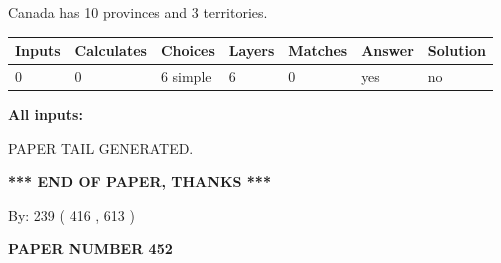 \documentclass[12pt]{article}
\begin{document}
 
\noindent{}
 
 
Canada has 10  provinces and 3 territories.
 
 
\noindent{}
 
 
   
   
   
   
\noindent\begin{tabular}{|l|l|l|l|l|l|l|}
 \hline
Inputs & Calculates & Choices & Layers & Matches & Answer & Solution \\ \hline
 0  & 
 0  & 
 6
  simple  
  & 
 6  & 
 0  & 
  yes & 
  no 
  \\ \hline
 \end{tabular}
   
   
   
   
\noindent{}
   
   
   
   
\noindent\vspace{0.1in}\hspace{-0.08in} {\textbf{\Large{All inputs: }}}
   
   
   
   
   
   
 \vspace{0.2in}
 
   
   
\vspace{2.0in} PAPER TAIL GENERATED.
   
   
   
   
\vspace{1.0in} 
{\textbf{\large{ *** END OF PAPER, THANKS *** }}} 
   
   
\hspace{1.0in} By: 
 239 ( 416 ,  613 )
   
   
   
   
\newpage 
\setcounter{page}{ 
   452001 } 
   
   
   
   
 {\textbf{ \Large{ PAPER NUMBER  452  }}}
   
   
\vspace{0.2in}
   
   
   
\end{document}
